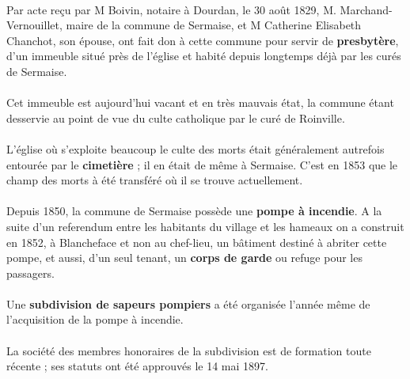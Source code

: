 \documentclass[../eBook.tex]{subfiles}
\begin{document}
    \paragraph{}Par acte reçu par M Boivin, notaire à Dourdan, le 30 août 1829, M. Marchand-Vernouillet, maire de la commune de Sermaise, et M Catherine Elisabeth Chanchot, son épouse, ont fait don à cette commune pour servir de \textbf{presbytère}, d'un immeuble situé près de l'église et habité depuis longtemps déjà par les curés de Sermaise.
    \paragraph{}Cet immeuble est aujourd'hui vacant et en très mauvais état, la commune étant desservie au point de vue du culte catholique par le curé de Roinville.
    \paragraph{}L'église où s'exploite beaucoup le culte des morts était généralement autrefois entourée par le \textbf{cimetière} ; il en était de même à Sermaise. C'est en 1853 que le champ des morts à été transféré où il se trouve actuellement.
    \paragraph{}Depuis 1850, la commune de Sermaise possède une \textbf{pompe à incendie}. A la suite d'un referendum entre les habitants du village et les hameaux on a construit en 1852, à Blancheface et non au chef-lieu, un bâtiment destiné à abriter cette pompe, et aussi, d'un seul tenant, un \textbf{corps de garde} ou refuge pour les passagers.
    \paragraph{}Une \textbf{subdivision de sapeurs pompiers} a été organisée l'année même de l'acquisition de la pompe à incendie.
    \paragraph{}La société des membres honoraires de la subdivision est de formation toute récente ; ses statuts ont été approuvés le 14 mai 1897.
\end{document}
